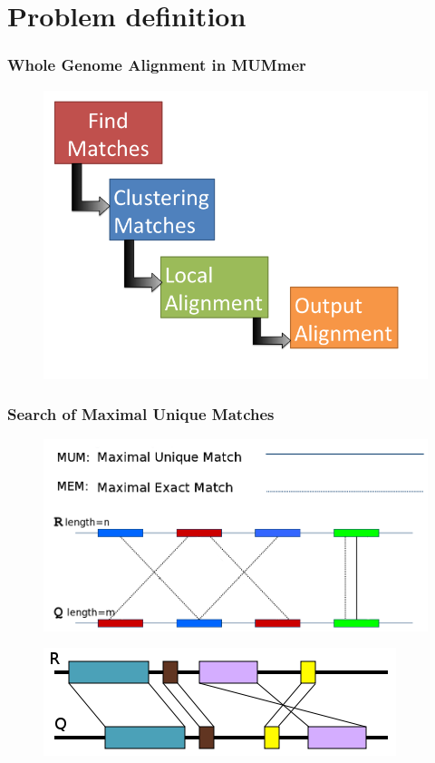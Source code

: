 \documentclass{beamer}
\begin{document}
\section{Problem definition}
\begin{frame}
  \frametitle{Whole Genome Alignment in MUMmer}
  \begin{figure}\includegraphics[scale=0.4]{wga.png}\end{figure}
\end{frame}
\begin{frame}
\frametitle{Search of Maximal Unique Matches}
\begin{figure}\includegraphics[scale=0.25]{mem-mum.png}\end{figure}
\begin{figure}\includegraphics[scale=0.555555]{mums.png}\end{figure}
\end{frame}
\end{document}
